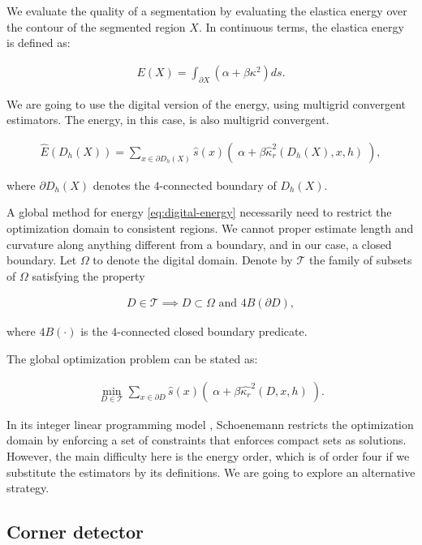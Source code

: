 \documentclass[runningheads]{llncs}
\begin{document}
We evaluate the quality of a segmentation by evaluating the elastica energy over the contour of the segmented region $X$. In continuous terms, the elastica energy is defined as:

\begin{align*}
	E(X) = \int_{\partial X}{(\alpha + \beta \kappa^2) ds}.
\end{align*}

We are going to use the digital version of the energy, using multigrid convergent estimators. The energy, in this case, is also multigrid convergent.

\begin{align}
	\hat{E}( D_h(X) ) = \sum_{x \in \partial D_h(X)}{ \hat{s}(x)\left(\; \alpha + \beta \hat{\kappa}_{r}^2(D_h(X),x,h) \; \right)}, 
	\label{eq:digital-energy}
\end{align}

where $\partial D_h(X)$ denotes the $4$-connected boundary of $D_h(X)$.

A global method for energy \eqref{eq:digital-energy} necessarily need to restrict the optimization domain to consistent regions. We cannot proper estimate length and curvature along anything different from a boundary, and in our case, a closed boundary. Let $\Omega$ to denote the digital domain. Denote by $\mathcal{T}$ the family of subsets of $\Omega$ satisfying the property

\begin{align*}
	D \in \mathcal{T} \implies D \subset \Omega \text{ and } 4B(\partial D),
\end{align*} 

where $4B(\cdot)$ is the $4$-connected closed boundary predicate. 


The global optimization problem can be stated as:

\begin{align*}
	\min_{D \in \mathcal{T}}{\sum_{x \in \partial D}{ \hat{s}(x)\left(\; \alpha + \beta \hat{\kappa_{r}}^2(D,x,h) \; \right)}.}
\end{align*}

In its integer linear programming model \cite{schoenemann09}, Schoenemann restricts the optimization domain by enforcing a set of constraints that enforces compact sets as solutions. However, the main difficulty here is the energy order, which is of order four if we substitute the estimators by its definitions. We are going to explore an alternative strategy.



\subsection{Corner detector}
\end{document}
